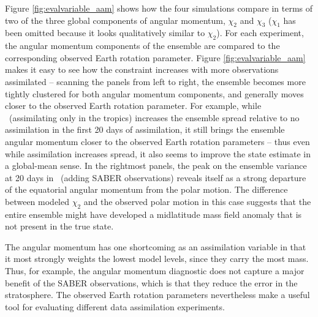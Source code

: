Figure \ref{fig:evalvariable_aam} shows how the four simulations compare in terms of two of the three global components of angular momentum, $\chi_2$ and $\chi_3$ ($\chi_1$ has been omitted because it looks qualitatively similar to $\chi_2$).  
For each experiment, the angular momentum components of the ensemble are compared  to the corresponding observed Earth rotation parameter. 
Figure  \ref{fig:evalvariable_aam} makes it easy to see how the constraint increases with more observations assimilated -- scanning the panels from left to right, the ensemble becomes more tightly clustered for both angular momentum components, and generally moves closer to the observed Earth rotation parameter. 
For example, while \WACCMTROPICS~(assimilating only in the tropics) increases the ensemble spread relative to no assimilation in the first 20 days of assimilation, it still brings the ensemble angular momentum closer to the observed Earth rotation parameters -- thus even while assimilation increases spread, it also seems to improve the state estimate in a global-mean sense.  
In the rightmost panels, the peak on the ensemble variance at 20 days in \NCARFULL~(adding SABER observations) reveals itself as a strong departure of the equatorial angular momentum from the polar motion.   
The difference between modeled $\chi_2$ and the observed polar motion in this case suggests that the entire ensemble might have developed a midlatitude mass field anomaly that is not present in the true state. 

The angular momentum has one shortcoming as an assimilation variable in that it most strongly weights the lowest model levels, since they carry the most mass. 
Thus, for example, the angular momentum diagnostic does not capture a major benefit of the SABER observations, which is that they reduce the error in the stratosphere. 
The observed Earth rotation parameters nevertheless make a useful tool for evaluating different data assimilation experiments. 
